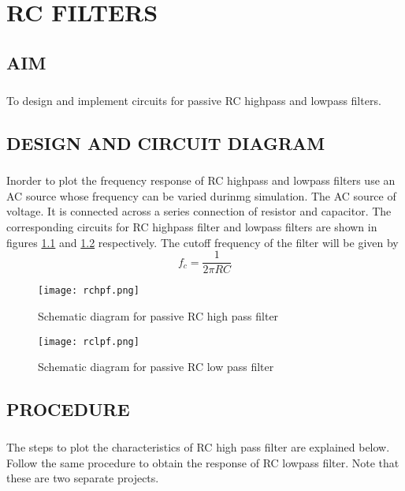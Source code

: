 \chapter{RC FILTERS}

\section*{AIM}
\paragraph{}To design and implement circuits for passive RC highpass and lowpass filters.

\section*{DESIGN AND CIRCUIT DIAGRAM}
\paragraph{}

Inorder to plot the frequency response of RC highpass and lowpass filters use an AC source whose frequency can be varied durinmg simulation. The AC source of voltage. It is connected across a series connection of resistor and capacitor. The corresponding circuits for RC highpass filter and lowpass filters are shown in figures \ref{rchpf} and  \ref{rclpf} respectively. The cutoff frequency of the filter will be given by \begin{equation}
f_c=\frac{1}{2\pi RC}
\end{equation}

\begin{figure}[h]
\centering
\texttt{[image: rchpf.png]}
\caption{Schematic diagram for passive RC high pass filter}
\label{rchpf}
\end{figure}

\begin{figure}[h]
\centering
\texttt{[image: rclpf.png]}
\caption{Schematic diagram for passive RC low pass filter}
\label{rclpf}
\end{figure}

\section*{PROCEDURE}

\paragraph{}The steps to plot the characteristics of RC high pass filter are explained below. Follow the same procedure to obtain the response of RC lowpass filter. Note that these are two separate projects. 


